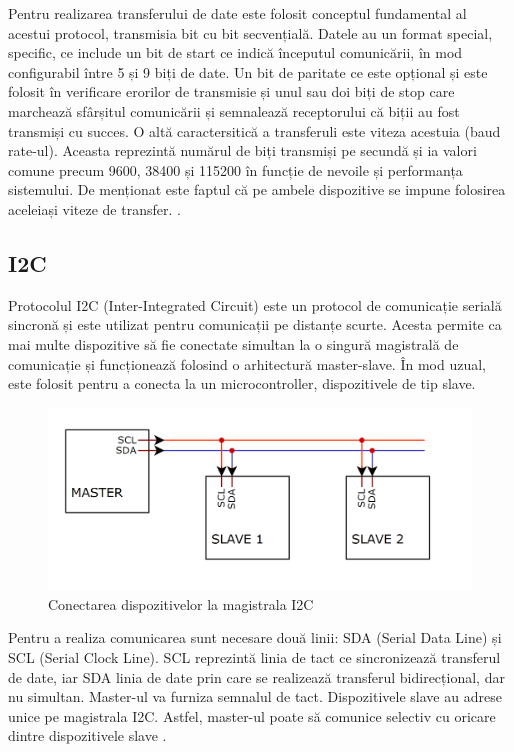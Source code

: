 Pentru realizarea transferului de date este folosit conceptul fundamental al acestui protocol, transmisia bit cu bit secvențială. Datele au un format special, specific, ce include un bit de start ce indică începutul comunicării, în mod configurabil între 5 și 9 biți de date. Un bit de paritate ce este opțional și este folosit în verificare erorilor de transmisie și unul sau doi biți de stop care marchează sfârșitul comunicării și semnalează receptorului că biții au fost transmiși cu succes. O altă caractersitică a transferuli este viteza acestuia (baud rate-ul). Aceasta reprezintă numărul de biți transmiși pe secundă și ia valori comune precum 9600, 38400 și 115200 în funcție de nevoile și performanța sistemului. De menționat este faptul că pe ambele dispozitive se impune folosirea aceleiași viteze de transfer. \cite{pena2020uart}. 

\subsection{I2C}
Protocolul I2C (Inter-Integrated Circuit) este un protocol de comunicație serială sincronă și este utilizat pentru comunicații pe distanțe scurte. Acesta permite ca mai multe dispozitive să fie conectate simultan la o singură magistrală de comunicație și funcționează folosind o arhitectură master-slave. În mod uzual, este folosit pentru a conecta la un microcontroller,  dispozitivele  de tip slave.

\begin{figure}[H]
\includegraphics[width=0.7\linewidth]{bachelors_ro/images/i2c_com.png}
\caption{Conectarea dispozitivelor la magistrala I2C}
\label{fig:i2c_com}
\end{figure}

Pentru a realiza comunicarea sunt necesare două linii: SDA (Serial Data Line) și SCL (Serial Clock Line). SCL reprezintă linia de tact ce sincronizează transferul de date, iar SDA linia de date prin care se realizează transferul bidirecțional, dar nu simultan. Master-ul va furniza semnalul de tact. Dispozitivele slave au adrese unice pe magistrala I2C. Astfel, master-ul poate să comunice selectiv cu oricare dintre dispozitivele slave \cite{xu2023design}.

